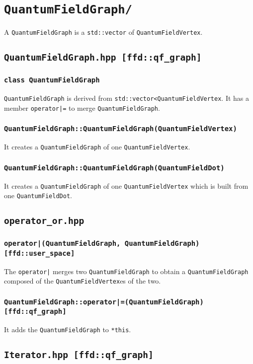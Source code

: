 \chapter{\texttt{QuantumFieldGraph/}}
A \texttt{QuantumFieldGraph} is a \texttt{std::vector} of \texttt{QuantumFieldVertex}.
\section{\texttt{QuantumFieldGraph.hpp [ffd::qf\_graph]}}
\subsection{\texttt{class QuantumFieldGraph}}
\texttt{QuantumFieldGraph} is derived from \texttt{std::vector<QuantumFieldVertex}. It has a member \texttt{operator|=} to merge \texttt{QuantumFieldGraph}.
\subsection{\texttt{QuantumFieldGraph::QuantumFieldGraph(QuantumFieldVertex)}}
It creates a \texttt{QuantumFieldGraph} of one \texttt{QuantumFieldVertex}.
\subsection{\texttt{QuantumFieldGraph::QuantumFieldGraph(QuantumFieldDot)}}
It creates a \texttt{QuantumFieldGraph} of one \texttt{QuantumFieldVertex} which is built from one \texttt{QuantumFieldDot}.
\section{\texttt{operator\_or.hpp}}
\subsection{\texttt{operator|(QuantumFieldGraph, QuantumFieldGraph) [ffd::user\_space] }}
The \texttt{operator|} merges two \texttt{QuantumFieldGraph} to obtain a \texttt{QuantumFieldGraph} composed of the \texttt{QuantumFieldVertex}es of the two.
\subsection{\texttt{QuantumFieldGraph::operator|=(QuantumFieldGraph) [ffd::qf\_graph]}}
It adds the \texttt{QuantumFieldGraph} to \texttt{*this}.
\section{\texttt{Iterator.hpp [ffd::qf\_graph]}}
